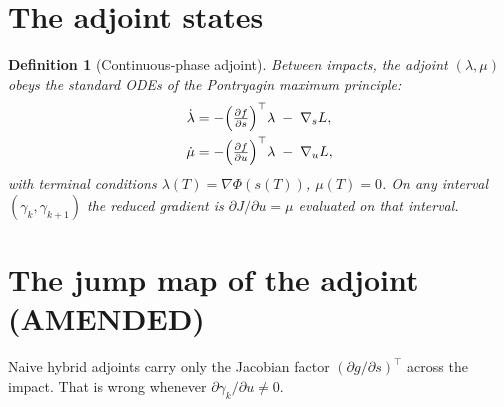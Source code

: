 \documentclass[11pt]{article}
\newtheorem{definition}{Definition}
\begin{document}
\section{The adjoint states}
\begin{definition}[Continuous-phase adjoint]
Between impacts, the adjoint $(\lambda, \mu)$ obeys the standard
ODEs of the Pontryagin maximum principle:
\begin{align}
  \dot\lambda &= -\Bigl(\tfrac{\partial f}{\partial s}\Bigr)^\top \lambda
                 \;-\; \nabla_s L, \\
  \dot\mu     &= -\Bigl(\tfrac{\partial f}{\partial u}\Bigr)^\top \lambda
                 \;-\; \nabla_u L,
\end{align}
with terminal conditions $\lambda(T) = \nabla\Phi(s(T))$, $\mu(T) = 0$.
On any interval $(\gamma_k, \gamma_{k+1})$ the reduced gradient is
$\partial J/\partial u = \mu$ evaluated on that interval.
\end{definition}

\section{The jump map of the adjoint (AMENDED)}
Naive hybrid adjoints carry only the Jacobian factor
$(\partial g/\partial s)^\top$ across the impact. That is wrong
whenever $\partial\gamma_k/\partial u \neq 0$.
\end{document}

